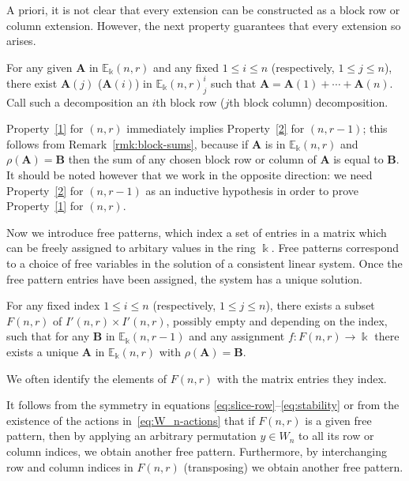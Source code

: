 \documentclass[ALCO,ThmDefs,Unicode,epreuves]{cedram}
\newcommand{\E}{\mathbb{E}}
\newcommand{\bA}{\mathbf{A}}
\newcommand{\bB}{\mathbf{B}}
\begin{document}
A priori, it is not clear that every extension can be constructed as a
block row or column extension. However, the next property guarantees
that every extension so arises.

\begin{property}\label{2}
 For any given $\bA$ in $\E_\Bbbk(n,r)$ and any fixed $1\le i \le n$
 \textup{(}respectively, $1 \le j \le n$\textup{)}, there exist
 $\bA(j)$ \textup{(}\resp $\bA(i)$\textup{)} in $\E_\Bbbk(n,r)^i_j$
 such that $\bA = \bA(1) + \cdots + \bA(n)$. Call such a
 decomposition an $i$th block row \textup{(}\resp $j$th block
 column\textup{)} decomposition.
\end{property}

Property~\ref{1} for $(n,r)$ immediately implies Property~\ref{2} for
$(n,r-1)$; this follows from Remark~\ref{rmk:block-sums}, because if
$\bA$ is in $\E_\Bbbk(n,r)$ and $\rho(\bA)=\bB$ then the sum of any
chosen block row or column of $\bA$ is equal to $\bB$. It should be
noted however that we work in the opposite direction: we need
Property~\ref{2} for $(n,r-1)$ as an inductive hypothesis in order to
prove Property~\ref{1} for $(n,r)$.

Now we introduce free patterns, which index a set of entries in a
matrix which can be freely assigned to arbitary values in the ring
$\Bbbk$. Free patterns correspond to a choice of free variables in
the solution of a consistent linear system. Once the free pattern
entries have been assigned, the system has a unique solution. 


\begin{property}\label{3}
 For any fixed index $1\le i \le n$ \textup{(}respectively, $1 \le j
 \le n$\textup{)}, there exists a subset $F(n,r)$ of $I'(n,r) \times
 I'(n,r)$, possibly empty and depending on the index, such that for
 any $\bB$ in $\E_\Bbbk(n,r-1)$ and any assignment $f: F(n,r) \to
 \Bbbk$ there exists a unique $\bA$ in $\E_\Bbbk(n,r)$ with
 $\rho(\bA) = \bB$.
\end{property}


\begin{rema}
We often identify the elements of $F(n,r)$ with the matrix entries
they index. 
\end{rema}


It follows from the symmetry in equations
\eqref{eq:slice-row}--\eqref{eq:stability} or from the existence of
the actions in~\eqref{eq:W_n-actions} that if $F(n,r)$ is a given free
pattern, then by applying an arbitrary permutation $y\in W_n$ to all
its row or column indices, we obtain another free
pattern. Furthermore, by interchanging row and column indices in
$F(n,r)$ (transposing) we obtain another free pattern.
\end{document}
